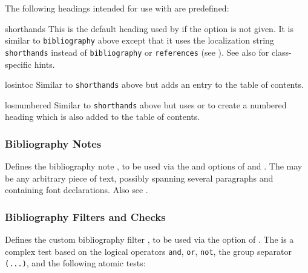 \documentclass{ltxdockit}[2011/03/25]
\begin{document}
The following headings intended for use with  are predefined:

\begin{valuelist*}

\item[shorthands]
This is the default heading used by  if the  option is not given. It is similar to \texttt{bibliography} above except that it uses the localization string \texttt{shorthands} instead of \texttt{bibliography} or \texttt{references} (see ). See also  for class-specific hints.

\item[losintoc]
Similar to \texttt{shorthands} above but adds an entry to the table of contents.

\item[losnumbered]
Similar to \texttt{shorthands} above but uses  or  to create a numbered heading which is also added to the table of contents.

\end{valuelist*}

\subsubsection{Bibliography Notes}
\label{use:bib:nts}

\begin{ltxsyntax}


Defines the bibliography note , to be used via the  and  options of  and . The  may be any arbitrary piece of text, possibly spanning several paragraphs and containing font declarations. Also see .

\end{ltxsyntax}

\subsubsection{Bibliography Filters and Checks}
\label{use:bib:flt}

\begin{ltxsyntax}


Defines the custom bibliography filter , to be used via the  option of . The  is a complex test based on the logical operators \texttt{and}, \texttt{or}, \texttt{not}, the group separator \texttt{(...)}, and the following atomic tests:

\end{ltxsyntax}
\end{document}
